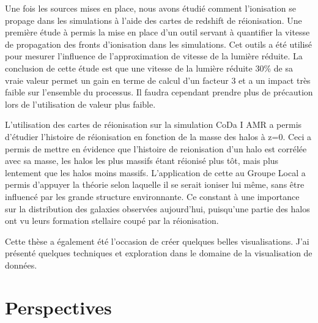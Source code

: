 Une fois les sources mises en place, nous avons étudié comment l'ionisation se propage dans les simulations à l'aide des cartes de redshift de réionisation.
Une première étude à permis la mise en place d'un outil servant à quantifier la vitesse de propagation des fronts d'ionisation dans les simulations.
Cet outils a été utilisé pour mesurer l'influence de l'approximation de vitesse de la lumière réduite.
La conclusion de cette étude est que une vitesse de la lumière réduite 30\% de sa vraie valeur permet un gain en terme de calcul d'un facteur 3 et a un impact très faible sur l'ensemble du processus.
Il faudra cependant prendre plus de précaution lors de l'utilisation de valeur plus faible.

L'utilisation des cartes de réionisation sur la simulation CoDa I AMR a permis d'étudier l'histoire de réionisation en fonction de la masse des halos à z=0.
Ceci a permis de mettre en évidence que l'histoire de reionisation d'un halo est corrélée avec sa masse, les halos les plus massifs étant réionisé plus tôt, mais plus lentement que les halos moins massifs.
L'application de cette au Groupe Local a permis d'appuyer la théorie selon  laquelle il se serait ioniser lui même, sans être influencé par les grande structure environnante.
Ce constant à une importance sur la distribution des galaxies observées aujourd'hui, puisqu'une partie des halos ont vu leurs formation stellaire coupé par la réionisation.



Cette thèse a également été l'occasion de créer quelques belles visualisations. %
J'ai présenté quelques techniques et exploration dans le domaine de la visualisation de données.



\clearpage
\chapter{Perspectives}

